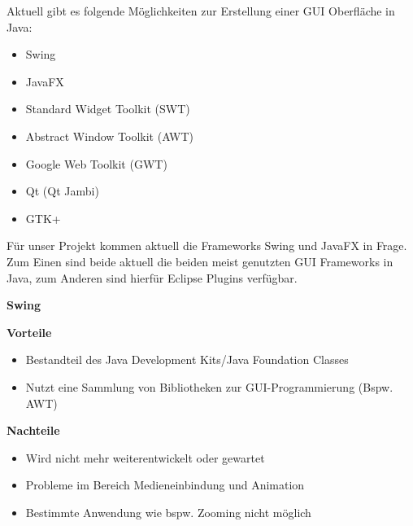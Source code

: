 
Aktuell gibt es folgende Möglichkeiten zur Erstellung einer GUI Oberfläche in Java:
 \begin{itemize}
	\item Swing
	\item JavaFX
	\item Standard Widget Toolkit (SWT)
	\item Abstract Window Toolkit (AWT)
	\item Google Web Toolkit (GWT)
	\item Qt (Qt Jambi)
	\item GTK+
\end{itemize}
\nsecend

Für unser Projekt kommen aktuell die Frameworks Swing und JavaFX in Frage. Zum Einen sind beide aktuell die beiden meist genutzten GUI Frameworks in Java, zum Anderen sind hierfür Eclipse Plugins verfügbar.
\nsecend


\textbf{Swing}

\textbf{Vorteile}
\begin{itemize}
	\item Bestandteil des Java Development Kits/Java Foundation Classes
	\item Nutzt eine Sammlung von Bibliotheken zur GUI-Programmierung (Bspw. AWT)
\end{itemize}


\textbf{Nachteile}
\begin{itemize}
	\item Wird nicht mehr weiterentwickelt oder gewartet
	\item Probleme im Bereich Medieneinbindung und Animation
	\item Bestimmte Anwendung wie bspw. Zooming nicht möglich
\end{itemize}



\nsecend %


